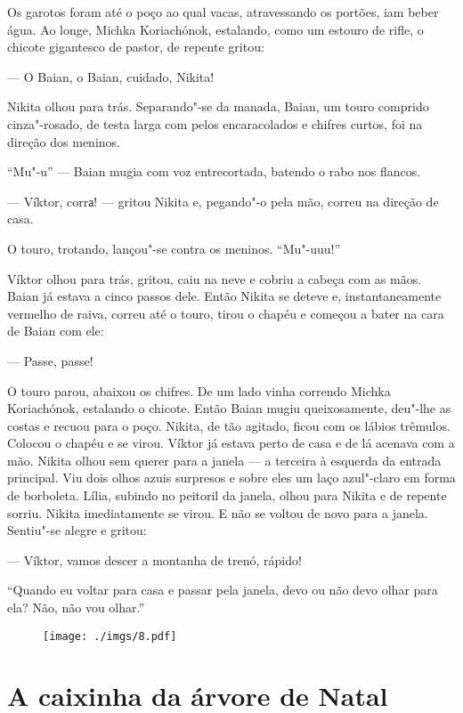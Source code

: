 Os garotos foram até o poço ao qual vacas, atravessando os portões, iam
beber água. Ao longe, Michka Koriachónok, estalando, como um estouro de
rifle, o chicote gigantesco de pastor, de repente gritou:

--- O Baian, o Baian, cuidado, Nikita!

Nikita olhou para trás. Separando"-se da manada, Baian, um touro comprido
cinza"-rosado, de testa larga com pelos encaracolados e chifres curtos,
foi na direção dos meninos.

``Mu"-u'' --- Baian mugia com voz entrecortada, batendo o rabo nos
flancos.

--- Víktor, corrа! --- gritou Nikita e, pegando"-o pela mão, correu na direção de
casa.

O touro, trotando, lançou"-se contra os meninos. ``Mu"-uuu!''

Víktor olhou para trás, gritou, caiu na neve e cobriu a cabeça com as
mãos. Baian já estava a cinco passos dele. Então Nikita se deteve e, instantaneamente
vermelho de raiva, correu até o touro, tirou o chapéu e
começou a bater na cara de Baian com ele:

--- Passe, passe!

O touro parou, abaixou os chifres. De um lado vinha correndo Michka
Koriachónok, estalando o chicote. Então Baian mugiu queixosamente,
deu"-lhe as costas e recuou para o poço. Nikita, de tão agitado, ficou com os
lábios trêmulos. Colocou o chapéu e se virou. Víktor já estava perto de
casa e de lá acenava com a mão. Nikita olhou sem querer para a janela
--- a terceira à esquerda da entrada principal. Viu dois olhos azuis
surpresos e sobre eles um laço azul"-claro em forma de borboleta. Lília,
subindo no peitoril da janela, olhou para Nikita e de repente sorriu.
Nikita imediatamente se virou. E não se voltou de novo para a janela.
Sentiu"-se alegre e gritou:

--- Víktor, vamos descer a montanha de trenó, rápido!

``Quando eu voltar para casa e passar pela janela, devo ou não devo
olhar para ela? Não, não vou olhar.''

\begin{figure}
\vspace*{-2.65cm}
\hspace*{-2.85cm}\texttt{[image: ./imgs/8.pdf]}
\end{figure}

\chapter{A caixinha da árvore de Natal}

